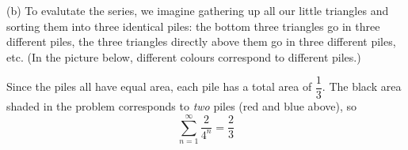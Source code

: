 \begin{solution}
\noindent (b) To evalutate the series,  we imagine gathering up all our little triangles and sorting them into three identical piles: the bottom three triangles go in three different piles, the three triangles directly above them go in three different piles, etc. (In the picture below, different colours correspond to different piles.)

\begin{center}
\end{center}

Since the piles all have equal area, each pile has a total area of $\dfrac 13$. The  black area shaded in the problem corresponds to \emph{two} piles (red and blue above), so
\[\sum_{n=1}^\infty \frac{2}{4^n}=\frac23\]
\end{solution}

